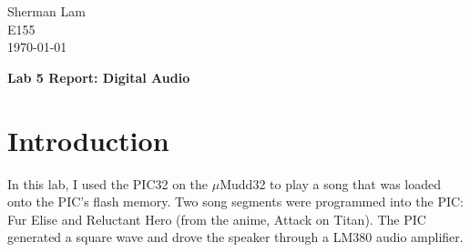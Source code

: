\documentclass[11pt]{article}
\begin{document}
\begin{flushleft}
Sherman Lam
\\E155
\\ \today
\end{flushleft}


\begin{center}
\begin{Large}
\textbf{Lab 5 Report: Digital Audio}
\end{Large}
\end{center}




\section{Introduction}
\label{sec:intro}

In this lab, I used the PIC32 on the $\mu$Mudd32 to play a song that was loaded onto the PIC's flash memory. Two song segments were programmed into the PIC: Fur Elise and Reluctant Hero (from the anime, Attack on Titan). The PIC generated a square wave and drove the speaker through a LM380 audio amplifier.
\end{document}
